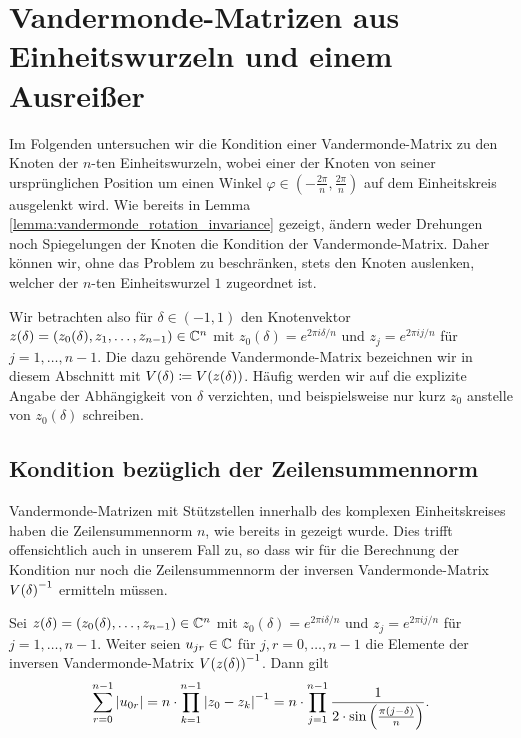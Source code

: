 \section[Vandermonde-Matrizen aus $(n\!-\!1)$ Einheitswurzeln und einem Ausreißer]{Vandermonde-Matrizen aus  Einheitswurzeln und einem Ausreißer}

Im Folgenden untersuchen wir die Kondition einer Vandermonde-Matrix zu den
Knoten der $n$-ten Einheitswurzeln, wobei einer der Knoten von seiner
ursprünglichen Position um einen Winkel
$\varphi \in \left(-\frac{2\pi}{n},\frac{2 \pi}{n}\right)$
auf dem Einheitskreis ausgelenkt wird.
Wie bereits in Lemma \ref{lemma:vandermonde_rotation_invariance} gezeigt,
ändern weder Drehungen noch Spiegelungen der Knoten die Kondition der
Vandermonde-Matrix.
Daher können wir, ohne das Problem zu beschränken, stets den Knoten auslenken,
welcher der $n$-ten Einheitswurzel $1$ zugeordnet ist.

Wir betrachten also für $\delta\!\in\!(-1, 1)$ den Knotenvektor
$z(\delta) = (z_0(\delta), z_1, \dots, z_{n-1}) \in \mathbb{C}^n$
mit
$z_0(\delta) = e^{2 \pi i \delta / n}$
und
$z_j = e^{2 \pi i j / n}$ für $j = 1, \dots, n-1$.
Die dazu gehörende Vandermonde-Matrix bezeichnen wir in diesem Abschnitt mit
$V \! \left( \delta \right) \coloneqq V \! \left( z(\delta) \right)$.
Häufig werden wir auf die explizite Angabe der Abhängigkeit von $\delta$
verzichten, und beispielsweise nur kurz $z_0$ anstelle von $z_0(\delta)$
schreiben.

\subsection{Kondition bezüglich der Zeilensummennorm}

Vandermonde-Matrizen mit Stützstellen innerhalb des komplexen Einheitskreises
haben die Zeilensummennorm $n$, wie bereits in
 gezeigt wurde.
Dies trifft offensichtlich auch in unserem Fall zu, so dass wir für die
Berechnung der Kondition nur noch die Zeilensummennorm der inversen
Vandermonde-Matrix $V \! \left( \delta \right)^{-1}$ ermitteln müssen.

\begin{lemma}
    \label{lemma:inverse_outlier_vandermonde_first_row_abs_sum}
    Sei $z(\delta) = (z_0(\delta), \dots, z_{n-1}) \in \mathbb{C}^n$ mit
    $z_0(\delta) = e^{2 \pi i \delta / n}$
    und
    $z_j = e^{2 \pi i j / n}$ für $j = 1, \dots, n-1$.
    Weiter seien $u_{jr} \in \mathbb{C}$ für $j,r = 0,\dots,n-1$ die Elemente der
    inversen Vandermonde-Matrix $V \! \left( z(\delta) \right)^{-1}$.
    Dann gilt
    \[
        \sum_{r=0}^{n-1} \left\lvert  u_{0r}  \right\rvert
        = n \cdot \prod_{k=1}^{n-1} \left\lvert z_0 - z_k \right\rvert^{-1}
        = n \cdot \prod_{j=1}^{n-1} \frac{1}{2 \cdot \sin \left(\frac{\pi (j - \delta)}{n} \right)}.
    \]
\end{lemma}

